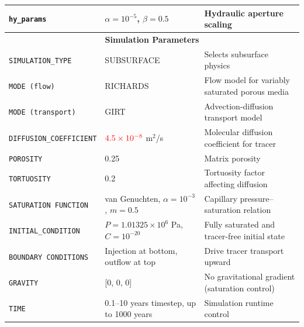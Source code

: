 \documentclass{article}
\begin{document}
\begin{table}[!htbp]
\begin{tabular}{|p{4cm}|p{4cm}|p{6.5cm}|}
\texttt{hy\_params} & $\alpha = 10^{-5}$, $\beta = 0.5$ & Hydraulic aperture scaling \\
\hline
\multicolumn{3}{|c|}{\textbf{Simulation Parameters}} \\
\hline
\texttt{SIMULATION\_TYPE} & SUBSURFACE & Selects subsurface physics \\
\texttt{MODE (flow)} & RICHARDS & Flow model for variably saturated porous media \\
\texttt{MODE (transport)} & GIRT & Advection-diffusion transport model \\
\texttt{DIFFUSION\_COEFFICIENT} & $ \color{red} 4.5 \times 10^{-8}$ m$^2$/s & Molecular diffusion coefficient for tracer \\
\texttt{POROSITY} & 0.25 & Matrix porosity \\
\texttt{TORTUOSITY} & 0.2 & Tortuosity factor affecting diffusion \\
\texttt{SATURATION FUNCTION} & van Genuchten, $\alpha = 10^{-3}$, $m=0.5$ & Capillary pressure–saturation relation \\
\texttt{INITIAL\_CONDITION} & $P = 1.01325 \times 10^6$ Pa, $C = 10^{-20}$ & Fully saturated and tracer-free initial state \\
\texttt{BOUNDARY CONDITIONS} & Injection at bottom, outflow at top & Drive tracer transport upward \\
\texttt{GRAVITY} & [0, 0, 0] & No gravitational gradient (saturation control) \\
\texttt{TIME} & 0.1–10 years timestep, up to 1000 years & Simulation runtime control \\
\hline
\end{tabular}
\label{tab:dfnWorksInputV4}
\end{table}
\end{document}
